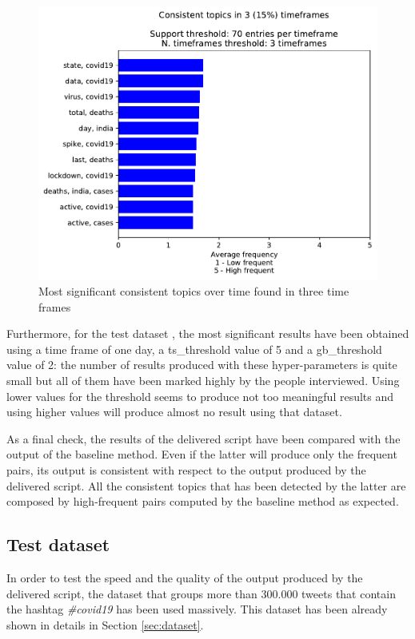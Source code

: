 \begin{figure}[h!]
	\centering
	\includegraphics[width=0.8\linewidth]{images/findings.pdf}
	\caption{Most significant consistent topics over time found in three time frames}
	\label{fig:finding}
\end{figure}

Furthermore, for the test dataset \cite{sentiment-analysis-dataset}, the most significant results have been obtained using a time frame of one day, a ts\_threshold value of 5 and a gb\_threshold value of 2: the number of results produced with these hyper-parameters is quite small but all of them have been marked highly by the people interviewed. Using lower values for the threshold seems to produce not too meaningful results and using higher values will produce almost no result using that dataset.

As a final check, the results of the delivered script have been compared with the output of the baseline method. Even if the latter will produce only the frequent pairs, its output is consistent with respect to the output produced by the delivered script. All the consistent topics that has been detected by the latter are composed by high-frequent pairs computed by the baseline method as expected.

\subsection{Test dataset}
\label{subsec:test_dataset}
In order to test the speed and the quality of the output produced by the delivered script, the dataset that groups more than 300.000 tweets that contain the hashtag \textit{\#covid19} \cite{covid19-tweets-dataset} has been used massively. This dataset has been already shown in details in Section \ref{sec:dataset}.


